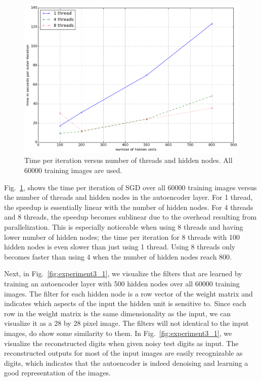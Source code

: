 \documentclass[conference]{IEEEtran}
\begin{document}
\begin{figure}[h]
\centering
\includegraphics[width=0.9\linewidth]{experiment2.png}
\caption{Time per iteration versus number of threads and hidden nodes. All 60000 training images are used.}
\label{fig:experiment2}
\end{figure}

Fig.~\ref{fig:experiment2}, shows the time per iteration of SGD over all 60000 training images versus the number of threads and hidden nodes in the autoencoder layer. For 1 thread, the speedup is essentially linear with the number of hidden nodes. For 4 threads and 8 threads, the speedup becomes sublinear due to the overhead resulting from parallelization. This is especially noticeable when using 8 threads and having lower number of hidden nodes; the time per iteration for 8 threads with 100 hidden nodes is even slower than just using 1 thread. Using 8 threads only becomes faster than using 4 when the number of hidden nodes reach 800. 

Next, in Fig.~\ref{fig:experiment3_1}, we visualize the filters that are learned by training an autoencoder layer with 500 hidden nodes over all 60000 training images. The  filter for each hidden node is a row vector of the weight matrix and indicates which aspects of the input the hidden unit is sensitive to. Since each row in the weight matrix is the same dimensionality as the input, we can visualize it as a 28 by 28 pixel image. The filters will not identical to the input images, do show some similarity to them. In Fig.~\ref{fig:experiment3_1}, we visualize the reconstructed digits when given noisy test digits as input. The reconstructed outputs for most of the input images are easily recognizable as digits, which indicates that the autoencoder is indeed denoising and learning a good representation of the images.
\end{document}
